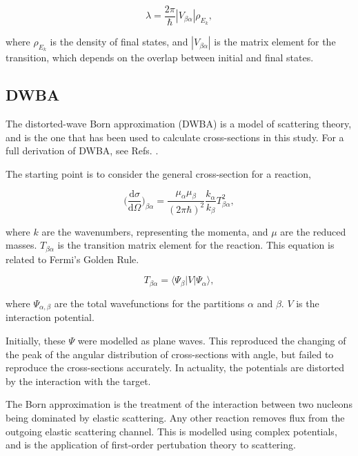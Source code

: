 \begin{equation}
\lambda = \frac{2 \pi}{\hbar} |V_{\beta \alpha}| \rho_{E_k}\mathrm{,}
\end{equation}

where $\rho_{E_k}$ is the density of final states, and $|V_{\beta \alpha}|$ is the matrix element for the transition, which depends on the overlap between initial and final states.

\subsection{DWBA} \label{ssec:DWBA}

The distorted-wave Born approximation (DWBA) is a model of scattering theory, and is the one that has been used to calculate cross-sections in this study. For a full derivation of DWBA, see Refs. \cite{satchler,glendenning}.

The starting point is to consider the general cross-section for a reaction, 

\begin{equation}
\bigg ( \frac{\mathrm{d} \sigma}{\mathrm{d} \Omega} \bigg )_{\beta \alpha} = \frac{\mu_\alpha \mu_\beta}{(2 \pi \hbar)^2}  \frac{k_\alpha}{k_\beta} \mathit{T}_{\beta\alpha}^2\mathrm{,}
\end{equation}

where $k$ are the wavenumbers, representing the momenta, and $\mu$ are the reduced masses. $\mathit{T}_{\beta\alpha}$ is the transition matrix element for the reaction. This equation is related to Fermi's Golden Rule.

\begin{equation}
\mathit{T}_{\beta\alpha} =  \langle \Psi_\beta | V | \Psi_\alpha \rangle,
\end{equation}

where $\Psi_{\alpha, \beta}$ are the total wavefunctions for the partitions $\alpha$ and $\beta$. $V$ is the interaction potential.

Initially, these $\Psi$ were modelled as plane waves. This reproduced the changing of the peak of the angular distribution of cross-sections with angle, but failed to reproduce the cross-sections accurately. In actuality, the potentials are distorted by the interaction with the target.

The Born approximation is the treatment of the interaction between two nucleons being dominated by elastic scattering. Any other reaction removes flux from the outgoing elastic scattering channel. This is modelled using complex potentials, and is the application of first-order pertubation theory to scattering.

